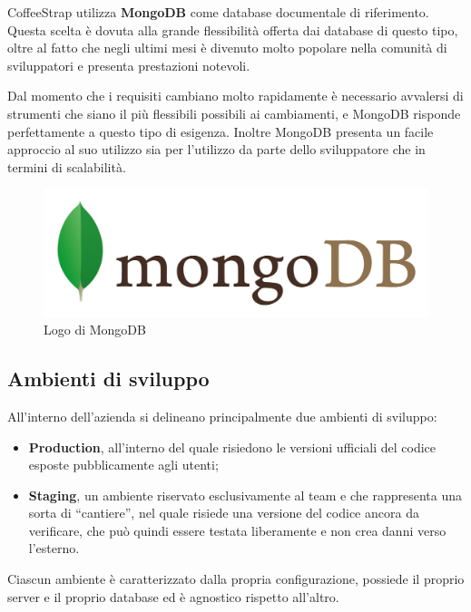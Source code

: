 CoffeeStrap utilizza \textbf{\gls{MongoDB}} come database documentale di riferimento. Questa scelta è dovuta alla grande flessibilità offerta dai database di questo tipo, oltre al fatto che negli ultimi mesi è divenuto molto popolare nella comunità di sviluppatori e presenta prestazioni notevoli. 

Dal momento che i requisiti cambiano molto rapidamente è necessario avvalersi di strumenti che siano il più flessibili possibili ai cambiamenti, e MongoDB risponde perfettamente a questo tipo di esigenza. Inoltre MongoDB presenta un facile approccio al suo utilizzo sia per l'utilizzo da parte dello sviluppatore che in termini di scalabilità.

\begin{figure}[htpd]
\centering
\includegraphics[width=\textwidth/2]{../immagini/mongo-db-logo}
\caption{Logo di MongoDB}
\end{figure}

\subsection{Ambienti di sviluppo}

All'interno dell'azienda si delineano principalmente due ambienti di sviluppo:

\begin{itemize}

\item \textbf{Production}, all'interno del quale risiedono le versioni ufficiali del codice esposte pubblicamente agli utenti;

\item \textbf{Staging}, un ambiente riservato esclusivamente al team e che rappresenta una sorta di ``cantiere'', nel quale risiede una versione del codice ancora da verificare, che può quindi essere testata liberamente e non crea danni verso l'esterno.

\end{itemize}

Ciascun ambiente è caratterizzato dalla propria configurazione, possiede il proprio server e il proprio database ed è agnostico rispetto all'altro.

